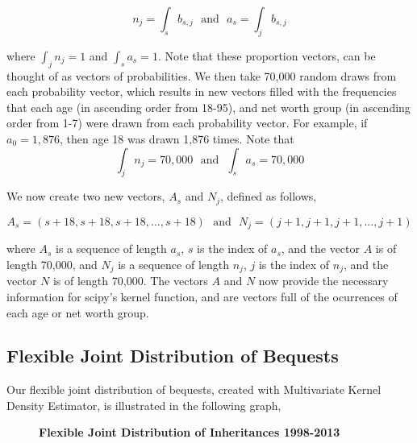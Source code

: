 \documentclass[letterpaper,12pt]{article}
\theoremstyle{definition}
\begin{document}
\begin{spacing}{1.5}
    \[n_j = \int_s b_{s,j}~~~\text{and}~~~a_s = \int_j b_{s,j}\]

    where $\int_j n_j = 1$ and $\int_s a_s = 1$. Note that these proportion vectors, can be thought of as vectors of probabilities. We then take 70,000 random draws from each probability vector, which results in new vectors filled with the frequencies that each age (in ascending order from 18-95), and net worth group (in ascending order from 1-7) were drawn from each probability vector. For example, if $a_0 = 1,876$, then age 18 was drawn 1,876 times. Note that
    \[\int_j n_j = 70,000~~~\text{and}~~~\int_s a_s = 70,000\]

   We now create two new vectors, $A_s$ and $N_j$, defined as follows,

    \[A_{s} = (s+18, s+18,s+18, ... , s+18)~~~\text{and}~~~N_{j} = (j+1, j+1,j+1, ... , j+1)\] 

    where $A_{s}$ is a sequence of length $a_s$, $s$ is the index of $a_s$, and the vector $A$ is of length 70,000, and $N_{j}$ is a sequence of length $n_j$, $j$ is the index of $n_j$, and the vector $N$ is of length 70,000. The vectors $A$ and $N$ now provide the necessary information for scipy's kernel function, and are vectors full of the ocurrences of each age or net worth group.

  \subsection{Flexible Joint Distribution of Bequests}\label{SecDistEst}

    Our flexible joint distribution of bequests, created with Multivariate Kernel Density Estimator, is illustrated in the following graph,\\

    \begin{figure}[htbp]\centering \captionsetup{width=6.0in}
      \caption{\label{MVKDE}\textbf{Flexible Joint Distribution of Inheritances 1998-2013}}
    \end{figure}


\end{spacing}
\end{document}

